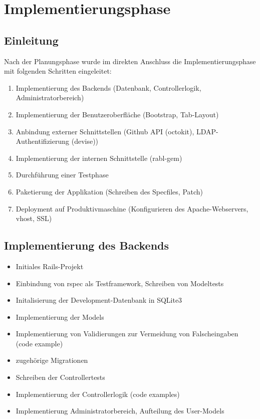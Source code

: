 \section{Implementierungsphase}
\label{sec:Implementierungsphase}

\subsection{Einleitung}
\label{sec:Einleitung}
Nach der Planungsphase wurde im direkten Anschluss die Implementierungsphase mit folgenden Schritten
eingeleitet:
\begin{enumerate}
	\item Implementierung des Backends (Datenbank, Controllerlogik, Administratorbereich)
	\item Implementierung der Benutzeroberfläche (Bootstrap, Tab-Layout)
	\item Anbindung externer Schnittstellen (Github API (octokit), LDAP-Authentifizierung (devise))
	\item Implementierung der internen Schnittstelle (rabl-gem)
	\item Durchführung einer Testphase
	\item Paketierung der Applikation (Schreiben des Specfiles, Patch)
	\item Deployment auf Produktivmaschine (Konfigurieren des Apache-Webservers, vhost, SSL)
\end{enumerate}

\subsection{Implementierung des Backends}
\label{sec:Implementierung des Backends}
\begin{itemize}
	\item Initiales Rails-Projekt
	\item Einbindung von rspec als Testframework, Schreiben von Modeltests
	\item Initalisierung der Development-Datenbank in SQLite3
	\item Implementierung der Models
	\item Implementierung von Validierungen zur Vermeidung von Falscheingaben (code example)
	\item zugehörige Migrationen
	\item Schreiben der Controllertests
	\item Implementierung der Controllerlogik (code examples)
	\item Implementierung Administratorbereich, Aufteilung des User-Models
\end{itemize}

